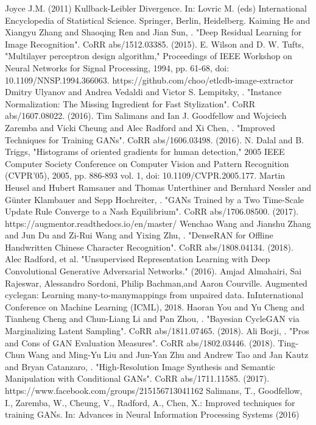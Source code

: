 \documentclass[12pt]{report}
\begin{document}
\begin{thebibliography}{9}
	 Joyce J.M. (2011) Kullback-Leibler Divergence. In: Lovric M. (eds) International Encyclopedia of Statistical Science. Springer, Berlin, Heidelberg.
	Kaiming He and Xiangyu Zhang and Shaoqing Ren and Jian Sun, . "Deep Residual Learning for Image Recognition". CoRR abs/1512.03385. (2015).
	 E. Wilson and D. W. Tufts, "Multilayer perceptron design algorithm," Proceedings of IEEE Workshop on Neural Networks for Signal Processing, 1994, pp. 61-68, doi: 10.1109/NNSP.1994.366063.
	 https://github.com/choo/etlcdb-image-extractor
	Dmitry Ulyanov and Andrea Vedaldi and Victor S. Lempitsky, . "Instance Normalization: The Missing Ingredient for Fast Stylization". CoRR abs/1607.08022. (2016).
	 Tim Salimans and Ian J. Goodfellow and Wojciech Zaremba and Vicki Cheung and Alec Radford and Xi Chen, . "Improved Techniques for Training GANs". CoRR abs/1606.03498. (2016).
	 N. Dalal and B. Triggs, "Histograms of oriented gradients for human detection," 2005 IEEE Computer Society Conference on Computer Vision and Pattern Recognition (CVPR'05), 2005, pp. 886-893 vol. 1, doi: 10.1109/CVPR.2005.177.
	 Martin Heusel and Hubert Ramsauer and Thomas Unterthiner and Bernhard Nessler and Günter Klambauer and Sepp Hochreiter, . "GANs Trained by a Two Time-Scale Update Rule Converge to a Nash Equilibrium". CoRR abs/1706.08500. (2017).
	 https://augmentor.readthedocs.io/en/master/
	 Wenchao Wang and Jianshu Zhang and Jun Du and Zi-Rui Wang and Yixing Zhu, . "DenseRAN for Offline Handwritten Chinese Character Recognition". CoRR abs/1808.04134. (2018).
	Alec Radford, et al. "Unsupervised Representation Learning with Deep Convolutional Generative Adversarial Networks." (2016). 
	 Amjad  Almahairi,  Sai  Rajeswar,  Alessandro  Sordoni,  Philip  Bachman,and  Aaron  Courville.    Augmented  cyclegan:  Learning  many-to-manymappings from unpaired data.  InInternational Conference on Machine Learning (ICML), 2018.
	 Haoran You and Yu Cheng and Tianheng Cheng and Chun-Liang Li and Pan Zhou, . "Bayesian CycleGAN via Marginalizing Latent Sampling". CoRR abs/1811.07465. (2018).
	 Ali Borji, . "Pros and Cons of GAN Evaluation Measures". CoRR abs/1802.03446. (2018).
	 Ting-Chun Wang and Ming-Yu Liu and Jun-Yan Zhu and Andrew Tao and Jan Kautz and Bryan Catanzaro, . "High-Resolution Image Synthesis and Semantic Manipulation with Conditional GANs". CoRR abs/1711.11585. (2017).
	 https://www.facebook.com/groups/215156713041162
	 Salimans, T., Goodfellow, I., Zaremba, W., Cheung, V., Radford, A., Chen, X.: Improved techniques for training GANs. In: Advances in Neural Information Processing Systems (2016)
\end{thebibliography}
\end{document}
